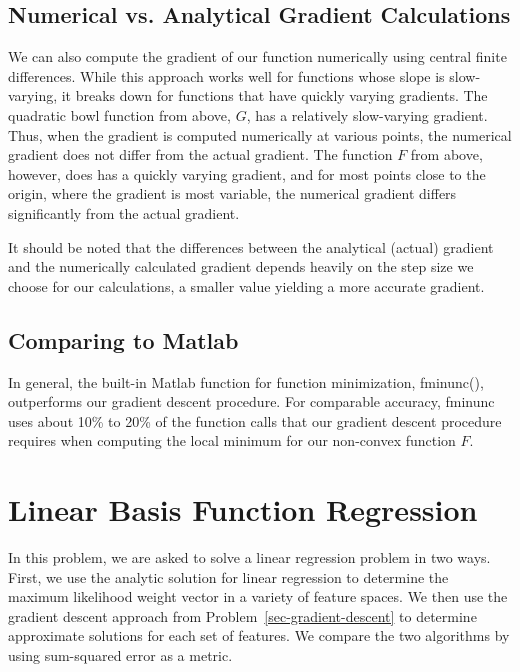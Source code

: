 \documentclass[11pt]{article}   %
\theoremstyle{plain}
\begin{document}
\subsection{Numerical vs. Analytical Gradient Calculations}
We can also compute the gradient of our function numerically using central finite differences. While this approach works well for functions whose slope is slow-varying, it breaks down for functions that have quickly varying gradients. The quadratic bowl function from above, $G$, has a relatively slow-varying gradient. Thus, when the gradient is computed numerically at various points, the numerical gradient does not differ from the actual gradient. The function $F$ from above, however, does has a quickly varying gradient, and for most points close to the origin, where the gradient is most variable, the numerical gradient differs significantly from the actual gradient. 

It should be noted that the differences between the analytical (actual) gradient and the numerically calculated gradient depends heavily on the step size we choose for our calculations, a smaller value yielding a more accurate gradient.

\subsection{Comparing to Matlab}
In general, the built-in Matlab function for function minimization, fminunc(), outperforms our gradient descent procedure. For comparable accuracy, fminunc uses about 10\% to 20\% of the function calls that our gradient descent procedure requires when computing the local minimum for our non-convex function $F$.

\section{Linear Basis Function Regression}\label{sec-basis}
In this problem, we are asked to solve a linear regression problem in two ways. First, we use the analytic solution for linear regression to determine the maximum likelihood weight vector in a variety of feature spaces. We then use the gradient descent approach from Problem~\ref{sec-gradient-descent} to determine approximate solutions for each set of features. We compare the two algorithms by using sum-squared error as a metric.
\end{document}

